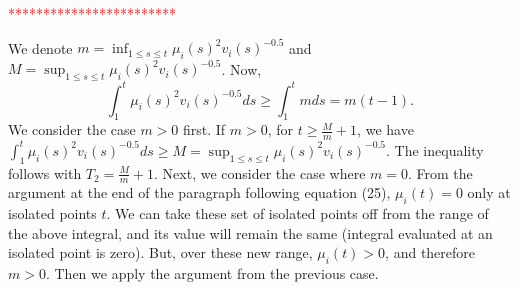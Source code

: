 \textcolor{red}{************************}

We denote $m = \inf_{1\leq s \leq t} \mu_i(s)^2 v_i(s)^{-0.5}$ and $M = \sup_{1\leq s \leq t} \mu_i(s)^2 v_i(s)^{-0.5}$. 
Now, $$\int_1^t \mu_i(s)^2 v_i(s)^{-0.5} ds \geq \int_1^t m ds = m(t-1).$$ We consider the case $m>0$ first. If $m>0$, for $t \geq \frac{M}{m}+1$, we have $\int_1^t \mu_i(s)^2 v_i(s)^{-0.5} ds \geq M = \sup_{1\leq s \leq t} \mu_i(s)^2 v_i(s)^{-0.5}$. The inequality follows with $T_2 = \frac{M}{m}+1$. Next, we consider the case where $m=0$. From the argument at the end of the paragraph following equation (25), $\mu_i(t) = 0$ only at isolated points $t$. We can take these set of isolated points off from the range of the above integral, and its value will remain the same (integral evaluated at an isolated point is zero). But, over these new range, $\mu_i(t) > 0$, and therefore $m > 0$. Then we apply the argument from the previous case.